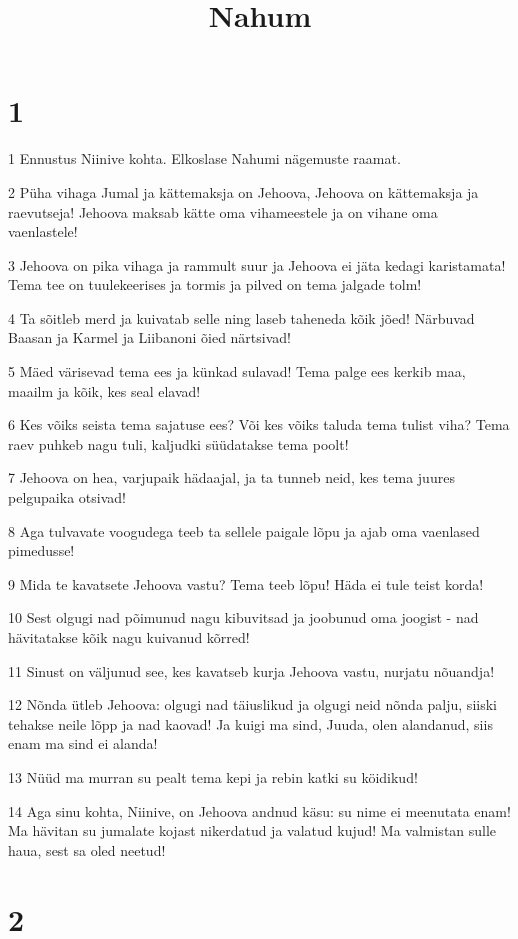 

\title{Nahum}

\chapter{1}

\par 1 Ennustus Niinive kohta. Elkoslase Nahumi nägemuste raamat.
\par 2 Püha vihaga Jumal ja kättemaksja on Jehoova, Jehoova on kättemaksja ja raevutseja! Jehoova maksab kätte oma vihameestele ja on vihane oma vaenlastele!
\par 3 Jehoova on pika vihaga ja rammult suur ja Jehoova ei jäta kedagi karistamata! Tema tee on tuulekeerises ja tormis ja pilved on tema jalgade tolm!
\par 4 Ta sõitleb merd ja kuivatab selle ning laseb taheneda kõik jõed! Närbuvad Baasan ja Karmel ja Liibanoni õied närtsivad!
\par 5 Mäed värisevad tema ees ja künkad sulavad! Tema palge ees kerkib maa, maailm ja kõik, kes seal elavad!
\par 6 Kes võiks seista tema sajatuse ees? Või kes võiks taluda tema tulist viha? Tema raev puhkeb nagu tuli, kaljudki süüdatakse tema poolt!
\par 7 Jehoova on hea, varjupaik hädaajal, ja ta tunneb neid, kes tema juures pelgupaika otsivad!
\par 8 Aga tulvavate voogudega teeb ta sellele paigale lõpu ja ajab oma vaenlased pimedusse!
\par 9 Mida te kavatsete Jehoova vastu? Tema teeb lõpu! Häda ei tule teist korda!
\par 10 Sest olgugi nad põimunud nagu kibuvitsad ja joobunud oma joogist - nad hävitatakse kõik nagu kuivanud kõrred!
\par 11 Sinust on väljunud see, kes kavatseb kurja Jehoova vastu, nurjatu nõuandja!
\par 12 Nõnda ütleb Jehoova: olgugi nad täiuslikud ja olgugi neid nõnda palju, siiski tehakse neile lõpp ja nad kaovad! Ja kuigi ma sind, Juuda, olen alandanud, siis enam ma sind ei alanda!
\par 13 Nüüd ma murran su pealt tema kepi ja rebin katki su köidikud!
\par 14 Aga sinu kohta, Niinive, on Jehoova andnud käsu: su nime ei meenutata enam! Ma hävitan su jumalate kojast nikerdatud ja valatud kujud! Ma valmistan sulle haua, sest sa oled neetud!


\chapter{2}

